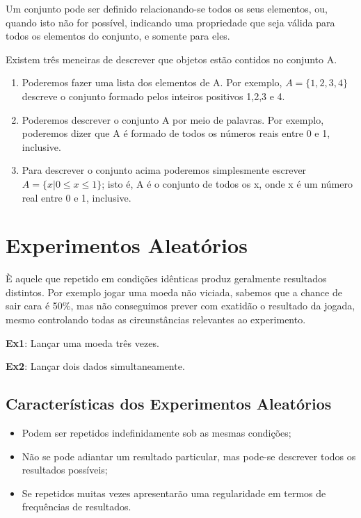 Um conjunto pode ser definido relacionando-se todos os seus
elementos, ou, quando isto não for possível, indicando uma
propriedade que seja válida para todos os elementos do conjunto, e
somente para eles.\vskip0.3cm


Existem três meneiras de descrever que objetos estão contidos no
conjunto A.

\begin{enumerate}
    \item Poderemos fazer uma lista dos elementos de A. Por
    exemplo, $A = \{ 1,2,3,4 \}$ descreve o conjunto formado pelos
    inteiros positivos 1,2,3 e 4.
    \item Poderemos descrever o conjunto A por meio de palavras.
    Por exemplo, poderemos dizer que A é formado de todos os
    números reais entre 0 e 1, inclusive.
    \item Para descrever o conjunto acima poderemos simplesmente
    escrever $A = \{ x|0\leq x \leq 1 \}$; isto é, A é o conjunto
    de todos os x, onde x é um número real entre 0 e 1, inclusive.
\end{enumerate}


\section{Experimentos Aleatórios}

È aquele que repetido em condições idênticas produz geralmente
resultados distintos. Por exemplo jogar uma moeda não viciada,
sabemos que a chance de sair cara é 50\%, mas não conseguimos
prever com exatidão o resultado da jogada, mesmo controlando todas
as circunstâncias relevantes ao experimento.\vskip0.3cm


\textbf{Ex1}: Lançar uma moeda três vezes. \vskip0.3cm

\textbf{Ex2}: Lançar dois dados simultaneamente. \vskip0.3cm

\subsection{Características dos Experimentos Aleatórios}


\begin{itemize}
    \item Podem ser repetidos indefinidamente sob as mesmas
   condições;
   \item Não se pode adiantar um resultado particular, mas
    pode-se descrever todos os resultados possíveis;
    \item Se repetidos muitas vezes apresentarão uma regularidade
    em termos de frequências de resultados.
\end{itemize}



